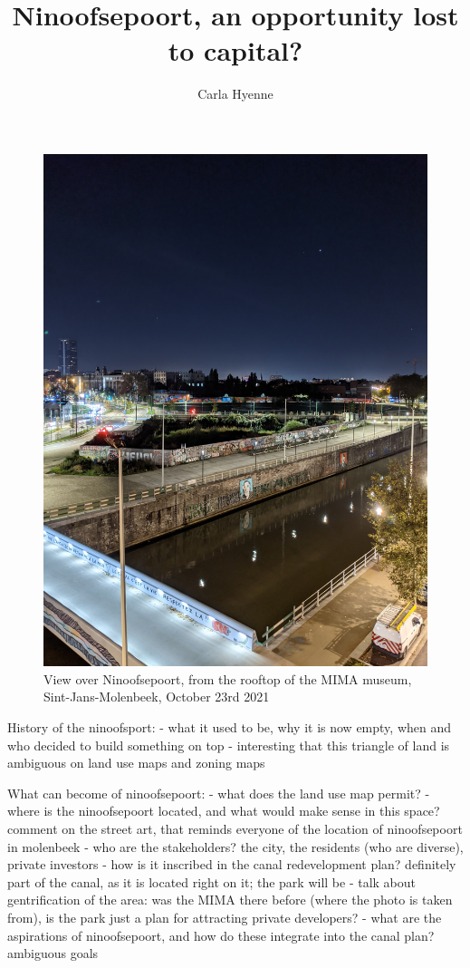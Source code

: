 \documentclass{article}[11pt]
\title{Ninoofsepoort, an opportunity lost to capital?}
\author{Carla Hyenne}
\begin{document}
\maketitle

\begin{figure}[h!]
	\centering
	\captionsetup{labelformat=empty}
	\includegraphics[width=\textwidth, angle=-90]{bxl_canal_far}
	\caption{View over Ninoofsepoort, from the rooftop of the MIMA museum, Sint-Jans-Molenbeek, October 23rd 2021}
\end{figure}

\pagebreak

History of the ninoofsport: 
- what it used to be, why it is now empty, when and who decided to build something on top
- interesting that this triangle of land is ambiguous on land use maps and zoning maps

What can become of ninoofsepoort:
- what does the land use map permit?
- where is the ninoofsepoort located, and what would make sense in this space? comment on the street art, that reminds everyone of the location of ninoofsepoort in molenbeek
- who are the stakeholders? the city, the residents (who are diverse), private investors
- how is it inscribed in the canal redevelopment plan? definitely part of the canal, as it is located right on it; the park will be 
- talk about gentrification of the area: was the MIMA there before (where the photo is taken from), is the park just a plan for attracting private developers?
- what are the aspirations of ninoofsepoort, and how do these integrate into the canal plan? ambiguous goals
\end{document}
